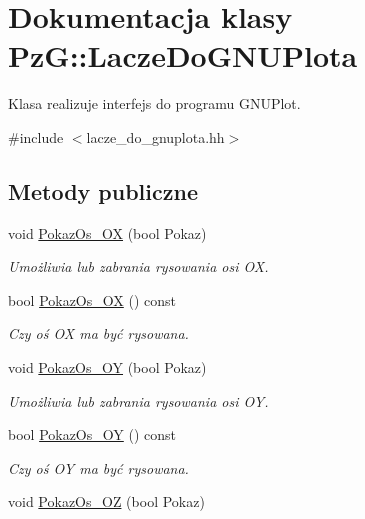 \hypertarget{class_pz_g_1_1_lacze_do_g_n_u_plota}{}\section{Dokumentacja klasy PzG\+::Lacze\+Do\+G\+N\+U\+Plota}
\label{class_pz_g_1_1_lacze_do_g_n_u_plota}


Klasa realizuje interfejs do programu G\+N\+U\+Plot.  




{\ttfamily \#include $<$lacze\+\_\+do\+\_\+gnuplota.\+hh$>$}

\subsection*{Metody publiczne}
\begin{DoxyCompactItemize}
\item 
void \mbox{\hyperlink{class_pz_g_1_1_lacze_do_g_n_u_plota_a11421d7c67deab6b7524cc492407e897}{Pokaz\+Os\+\_\+\+OX}} (bool Pokaz)
\begin{DoxyCompactList}\small\item\em Umożliwia lub zabrania rysowania osi OX. \end{DoxyCompactList}\item 
bool \mbox{\hyperlink{class_pz_g_1_1_lacze_do_g_n_u_plota_ae112972af57167c3b053bf922bce6bbf}{Pokaz\+Os\+\_\+\+OX}} () const
\begin{DoxyCompactList}\small\item\em Czy oś OX ma być rysowana. \end{DoxyCompactList}\item 
void \mbox{\hyperlink{class_pz_g_1_1_lacze_do_g_n_u_plota_a7c3db909b266fc30808e86406c04b516}{Pokaz\+Os\+\_\+\+OY}} (bool Pokaz)
\begin{DoxyCompactList}\small\item\em Umożliwia lub zabrania rysowania osi OY. \end{DoxyCompactList}\item 
bool \mbox{\hyperlink{class_pz_g_1_1_lacze_do_g_n_u_plota_a7298f469f6932f5c808dcf620650b4b8}{Pokaz\+Os\+\_\+\+OY}} () const
\begin{DoxyCompactList}\small\item\em Czy oś OY ma być rysowana. \end{DoxyCompactList}\item 
void \mbox{\hyperlink{class_pz_g_1_1_lacze_do_g_n_u_plota_a9fabfe88cb1801a5de8923f45f514b99}{Pokaz\+Os\+\_\+\+OZ}} (bool Pokaz)

\end{DoxyCompactItemize}
